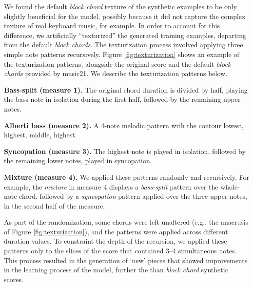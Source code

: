 We found the default \emph{block chord} texture of the
synthetic examples to be only slightly beneficial for the
model, possibly because it did not capture the complex
texture of real keyboard music, for example. In order to
account for this difference, we artificially ``texturized''
the generated training examples, departing from the default
\emph{block chords}. The texturization process involved
applying three simple note patterns recursively. Figure
\ref{fig:texturization} shows an example of the
texturization patterns, alongside the original score and the
default \emph{block chords} provided by music21. We describe
the texturization patterns below.

\textbf{Bass-split (measure 1).} The original chord duration
is divided by half, playing the bass note in isolation
during the first half, followed by the remaining upper
notes.

\textbf{Alberti bass (measure 2).} A 4-note melodic pattern
with the contour lowest, highest, middle, highest.

\textbf{Syncopation (measure 3).} The highest note is played
in isolation, followed by the remaining lower notes, played
in syncopation.

\textbf{Mixture (measure 4).} We applied these patterns
randomly and recursively. For example, the \emph{mixture} in
measure 4 displays a \emph{bass-split} pattern over the
whole-note chord, followed by a \emph{syncopation} pattern
applied over the three upper notes, in the second half of
the measure.

As part of the randomization, some chords were left
unaltered (e.g., the anacrusis of Figure
\ref{fig:texturization}), and the patterns were applied
across different duration values. To constraint the depth of
the recursion, we applied these patterns only to the slices
of the score that contained 3--4 simultaneous notes. This
process resulted in the generation of `new' pieces that
showed improvements in the learning process of the model,
further the than \emph{block chord} synthetic scores.
